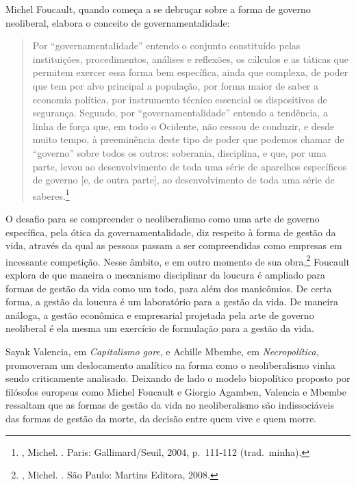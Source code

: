 Michel Foucault, quando começa a se debruçar sobre a forma de governo
neoliberal, elabora o conceito de governamentalidade:

\begin{quote}
Por ``governamentalidade'' entendo o conjunto constituído pelas
instituições, procedimentos, análises e reﬂexões, os cálculos e as
táticas que permitem exercer essa forma bem especíﬁca, ainda que
complexa, de poder que tem por alvo principal a população, por forma
maior de saber a economia política, por instrumento técnico essencial os
dispositivos de segurança. Segundo, por ``governamentalidade'' entendo a
tendência, a linha de força que, em todo o Ocidente, não cessou de
conduzir, e desde muito tempo, à preeminência deste tipo de poder que
podemos chamar de ``governo'' sobre todos os outros: soberania,
disciplina, e que, por uma parte, levou ao desenvolvimento de toda uma
série de aparelhos especíﬁcos de governo {[}e, de outra parte{]}, ao
desenvolvimento de toda uma série de saberes.\footnote{,
  Michel. {}. Paris: Gallimard/Seuil, 2004, p.~111-112 (trad.~minha).}
\end{quote}

O desafio para se compreender o neoliberalismo como uma arte de governo
específica, pela ótica da governamentalidade, diz respeito à forma de
gestão da vida, através da qual as pessoas passam a ser compreendidas como empresas em
incessante competição. Nesse âmbito, e em outro momento de sua
obra,\footnote{, Michel. {}. São Paulo: Martins Editora, 2008.}
Foucault explora de que maneira o mecanismo disciplinar da loucura é
ampliado para formas de gestão da vida como um todo, para além dos manicômios. De certa forma, a gestão da
loucura é um laboratório para a gestão da vida. De maneira análoga, a gestão econômica e empresarial projetada pela
arte de governo neoliberal é ela mesma um exercício de formulação
para a gestão da vida.

Sayak Valencia, em \emph{Capitalismo gore}, e Achille Mbembe, em
\emph{Necropolítica}, promoveram um deslocamento analítico na forma como
o neoliberalismo vinha sendo criticamente analisado. Deixando de lado o
modelo biopolítico proposto por filósofos europeus como Michel Foucault
e Giorgio Agamben, Valencia e Mbembe ressaltam que as formas
de gestão da vida no neoliberalismo são indissociáveis das formas de
gestão da morte, da decisão entre quem vive e quem morre.

